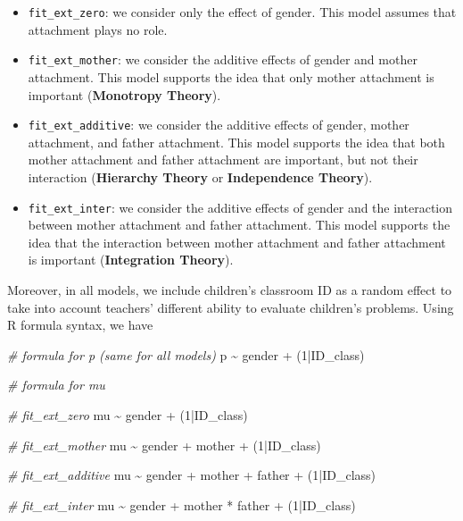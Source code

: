 \documentclass[
]{book}
\newenvironment{Shaded}{\begin{snugshade}}{\end{snugshade}}
\newcommand{\CommentTok}[1]{\textcolor[rgb]{0.56,0.35,0.01}{\textit{#1}}}
\newcommand{\DecValTok}[1]{\textcolor[rgb]{0.00,0.00,0.81}{#1}}
\newcommand{\NormalTok}[1]{#1}
\newcommand{\SpecialCharTok}[1]{\textcolor[rgb]{0.00,0.00,0.00}{#1}}
\providecommand{\tightlist}{%
  \setlength{\itemsep}{0pt}\setlength{\parskip}{0pt}}
\begin{document}
\begin{itemize}
\tightlist
\item
  \texttt{fit\_ext\_zero}: we consider only the effect of gender. This model assumes that attachment plays no role.
\item
  \texttt{fit\_ext\_mother}: we consider the additive effects of gender and mother attachment. This model supports the idea that only mother attachment is important (\textbf{Monotropy Theory}).
\item
  \texttt{fit\_ext\_additive}: we consider the additive effects of gender, mother attachment, and father attachment. This model supports the idea that both mother attachment and father attachment are important, but not their interaction (\textbf{Hierarchy Theory} or \textbf{Independence Theory}).
\item
  \texttt{fit\_ext\_inter}: we consider the additive effects of gender and the interaction between mother attachment and father attachment. This model supports the idea that the interaction between mother attachment and father attachment is important (\textbf{Integration Theory}).
\end{itemize}

Moreover, in all models, we include children's classroom ID as a random effect to take into account teachers' different ability to evaluate children's problems. Using R formula syntax, we have

\begin{Shaded}
\begin{Highlighting}[]
\CommentTok{\# formula for p (same for all models)}
\NormalTok{p }\SpecialCharTok{\textasciitilde{}}\NormalTok{ gender }\SpecialCharTok{+}\NormalTok{ (}\DecValTok{1}\SpecialCharTok{|}\NormalTok{ID\_class)}

\CommentTok{\# formula for mu}

\CommentTok{\# fit\_ext\_zero}
\NormalTok{mu }\SpecialCharTok{\textasciitilde{}}\NormalTok{ gender }\SpecialCharTok{+}\NormalTok{ (}\DecValTok{1}\SpecialCharTok{|}\NormalTok{ID\_class)}

\CommentTok{\# fit\_ext\_mother}
\NormalTok{mu }\SpecialCharTok{\textasciitilde{}}\NormalTok{ gender }\SpecialCharTok{+}\NormalTok{ mother }\SpecialCharTok{+}\NormalTok{ (}\DecValTok{1}\SpecialCharTok{|}\NormalTok{ID\_class)}

\CommentTok{\# fit\_ext\_additive}
\NormalTok{mu }\SpecialCharTok{\textasciitilde{}}\NormalTok{ gender }\SpecialCharTok{+}\NormalTok{ mother }\SpecialCharTok{+}\NormalTok{ father }\SpecialCharTok{+}\NormalTok{ (}\DecValTok{1}\SpecialCharTok{|}\NormalTok{ID\_class)}

\CommentTok{\# fit\_ext\_inter}
\NormalTok{mu }\SpecialCharTok{\textasciitilde{}}\NormalTok{ gender }\SpecialCharTok{+}\NormalTok{ mother }\SpecialCharTok{*}\NormalTok{ father }\SpecialCharTok{+}\NormalTok{ (}\DecValTok{1}\SpecialCharTok{|}\NormalTok{ID\_class)}
\end{Highlighting}
\end{Shaded}
\end{document}
